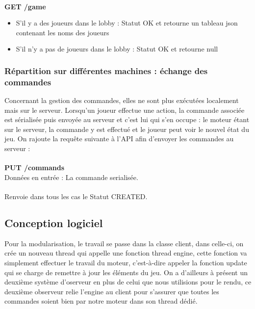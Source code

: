 \documentclass[a4paper,12pt]{article}
\begin{document}
\textbf{\\GET /game}\\
\begin{itemize}
\item S'il y a des joueurs dans le lobby : Statut OK et retourne un tableau json contenant les noms des joueurs
\item S'il n'y a pas de joueurs dans le lobby : Statut OK et retourne null
\end{itemize}

\subsubsection{Répartition sur différentes machines : échange des commandes}

Concernant la gestion des commandes, elles ne sont plus exécutées localement mais sur le serveur. Lorsqu'un joueur effectue une action,  la commande associée est sérialisée puis envoyée au serveur et c'est lui qui s'en occupe :  le moteur étant sur le serveur, la commande y est effectué et le joueur peut voir le nouvel état du jeu.
On rajoute la requête suivante à l'API afin d'envoyer les commandes au serveur :\\\\
\textbf{PUT /commands}\\
Données en entrée :  La commande serialisée.\\\\
Renvoie dans tous les cas le Statut CREATED.


\clearpage
\subsection{Conception logiciel}

Pour la modularisation, le travail se passe dans la classe client, dans celle-ci, on crée un nouveau thread qui appelle une fonction thread engine, cette fonction va simplement effectuer le travail du moteur, c'est-à-dire appeler la fonction update qui se charge de remettre à jour les éléments du jeu. On a d'ailleurs à présent un deuxième système d'oserveur en plus de celui que nous utilisions pour le rendu, ce deuxième observeur relie l'engine au client pour s'assurer que toutes les commandes soient bien par notre moteur dans son thread dédié.
\end{document}
